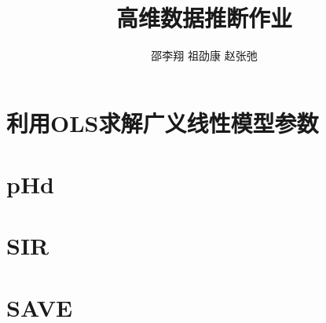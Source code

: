 \documentclass[cn,11pt]{elegantpaper}
\title{高维数据推断作业}
\author{邵李翔 \quad 祖劭康 \quad 赵张弛}
\date{}
\begin{document}
    


\maketitle
\newpage
\tableofcontents

\newpage
\section{利用OLS求解广义线性模型参数}



\section{pHd}

\section{SIR}

\section{SAVE}


\end{document}
